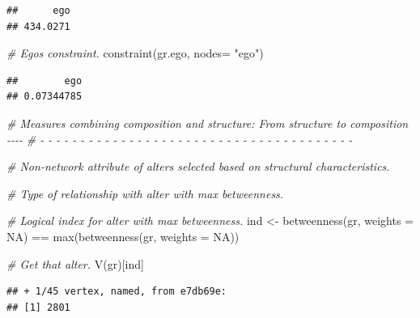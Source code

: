 \documentclass[
]{book}
\newenvironment{Shaded}{\begin{snugshade}}{\end{snugshade}}
\newcommand{\AttributeTok}[1]{\textcolor[rgb]{0.77,0.63,0.00}{#1}}
\newcommand{\CommentTok}[1]{\textcolor[rgb]{0.56,0.35,0.01}{\textit{#1}}}
\newcommand{\ConstantTok}[1]{\textcolor[rgb]{0.00,0.00,0.00}{#1}}
\newcommand{\FunctionTok}[1]{\textcolor[rgb]{0.00,0.00,0.00}{#1}}
\newcommand{\NormalTok}[1]{#1}
\newcommand{\OtherTok}[1]{\textcolor[rgb]{0.56,0.35,0.01}{#1}}
\newcommand{\SpecialCharTok}[1]{\textcolor[rgb]{0.00,0.00,0.00}{#1}}
\newcommand{\StringTok}[1]{\textcolor[rgb]{0.31,0.60,0.02}{#1}}
\begin{document}
\begin{verbatim}
##      ego 
## 434.0271
\end{verbatim}

\begin{Shaded}
\begin{Highlighting}[]
\CommentTok{\# Ego\textquotesingle{}s constraint.}
\FunctionTok{constraint}\NormalTok{(gr.ego, }\AttributeTok{nodes=} \StringTok{"ego"}\NormalTok{)}
\end{Highlighting}
\end{Shaded}

\begin{verbatim}
##        ego 
## 0.07344785
\end{verbatim}

\begin{Shaded}
\begin{Highlighting}[]
\CommentTok{\# Measures combining composition and structure: From structure to composition {-}{-}{-}{-}}
\CommentTok{\# {-} {-} {-} {-} {-} {-} {-} {-} {-} {-} {-} {-} {-} {-} {-} {-} {-} {-} {-} {-} {-} {-} {-} {-} {-} {-} {-} {-} {-} {-} {-} {-} {-} {-} {-} {-} {-} {-} {-} }

\CommentTok{\# Non{-}network attribute of alters selected based on structural characteristics.}

\CommentTok{\# Type of relationship with alter with max betweenness.}

\CommentTok{\# Logical index for alter with max betweenness.}
\NormalTok{ind }\OtherTok{\textless{}{-}} \FunctionTok{betweenness}\NormalTok{(gr, }\AttributeTok{weights =} \ConstantTok{NA}\NormalTok{) }\SpecialCharTok{==} \FunctionTok{max}\NormalTok{(}\FunctionTok{betweenness}\NormalTok{(gr, }\AttributeTok{weights =} \ConstantTok{NA}\NormalTok{))}

\CommentTok{\# Get that alter.}
\FunctionTok{V}\NormalTok{(gr)[ind]}
\end{Highlighting}
\end{Shaded}

\begin{verbatim}
## + 1/45 vertex, named, from e7db69e:
## [1] 2801
\end{verbatim}

\begin{Shaded}
\end{Shaded}
\end{document}

